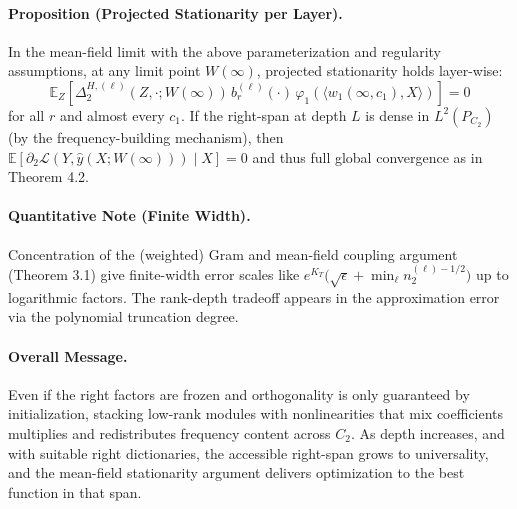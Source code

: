 \documentclass{article}
\begin{document}
\paragraph{Proposition (Projected Stationarity per Layer).}
In the mean-field limit with the above parameterization and regularity assumptions, at any limit point $W(\infty)$, projected stationarity holds layer-wise:
\[
    \mathbb{E}_Z \left[ \Delta_{2}^{H,(\ell)}(Z, \cdot; W(\infty))\, b_r^{(\ell)}(\cdot)\, \varphi_1(\langle w_1(\infty, c_1), X\rangle) \right] = 0
\]
for all $r$ and almost every $c_1$. If the right-span at depth $L$ is dense in $L^2(P_{C_2})$ (by the frequency-building mechanism), then $\mathbb{E}\left[ \partial_2 \mathcal{L}(Y, \hat{y}(X; W(\infty))) \mid X\right] = 0$ and thus full global convergence as in Theorem 4.2.

\paragraph{Quantitative Note (Finite Width).}
Concentration of the (weighted) Gram and mean-field coupling argument (Theorem 3.1) give finite-width error scales like $e^{K_T} \big( \sqrt{\epsilon} + \min_\ell n_2^{(\ell)-1/2} \big)$ up to logarithmic factors. The rank-depth tradeoff appears in the approximation error via the polynomial truncation degree.

\paragraph{Overall Message.}
Even if the right factors are frozen and orthogonality is only guaranteed by initialization, stacking low-rank modules with nonlinearities that mix coefficients multiplies and redistributes frequency content across $C_2$. As depth increases, and with suitable right dictionaries, the accessible right-span grows to universality, and the mean-field stationarity argument delivers optimization to the best function in that span.
\end{document}
